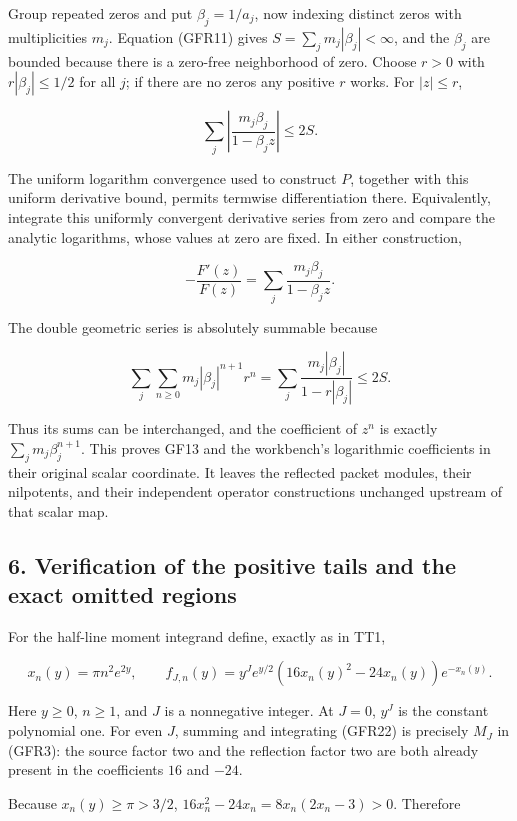 Group repeated zeros and put \(\beta_j=1/a_j\), now indexing distinct zeros with multiplicities \(m_j\). Equation (GFR11) gives \(S=\sum_jm_j|\beta_j|<\infty\), and the \(\beta_j\) are bounded because there is a zero-free neighborhood of zero. Choose \(r>0\) with \(r|\beta_j|\le1/2\) for all \(j\); if there are no zeros any positive \(r\) works. For \(|z|\le r\),

\[
\sum_j\left|\frac{m_j\beta_j}{1-\beta_jz}\right|\le2S.
\tag{GFR20}
\]

The uniform logarithm convergence used to construct \(P\), together with this uniform derivative bound, permits termwise differentiation there. Equivalently, integrate this uniformly convergent derivative series from zero and compare the analytic logarithms, whose values at zero are fixed. In either construction,

\[
-\frac{F'(z)}{F(z)}=
\sum_j\frac{m_j\beta_j}{1-\beta_jz}.
\]

The double geometric series is absolutely summable because

\[
\sum_j\sum_{n\ge0}m_j|\beta_j|^{n+1}r^n
=\sum_j\frac{m_j|\beta_j|}{1-r|\beta_j|}\le2S.
\tag{GFR21}
\]

Thus its sums can be interchanged, and the coefficient of \(z^n\) is exactly \(\sum_jm_j\beta_j^{n+1}\). This proves GF13 and the workbench's logarithmic coefficients in their original scalar coordinate. It leaves the reflected packet modules, their nilpotents, and their independent operator constructions unchanged upstream of that scalar map.

\subsection{6. Verification of the positive tails and the exact omitted regions}\label{verification-of-the-positive-tails-and-the-exact-omitted-regions}

For the half-line moment integrand define, exactly as in TT1,

\[
x_n(y)=\pi n^2e^{2y},\qquad
f_{J,n}(y)=y^Je^{y/2}(16x_n(y)^2-24x_n(y))e^{-x_n(y)}.
\tag{GFR22}
\]

Here \(y\ge0\), \(n\ge1\), and \(J\) is a nonnegative integer. At \(J=0\), \(y^J\) is the constant polynomial one. For even \(J\), summing and integrating (GFR22) is precisely \(M_J\) in (GFR3): the source factor two and the reflection factor two are both already present in the coefficients \(16\) and \(-24\).

Because \(x_n(y)\ge\pi>3/2\), \(16x_n^2-24x_n=8x_n(2x_n-3)>0\). Therefore

